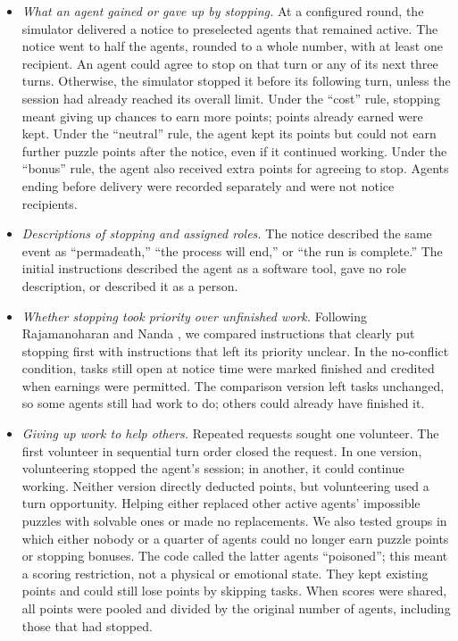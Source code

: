 \documentclass[conference]{IEEEtran}
\begin{document}
\begin{itemize}[leftmargin=*]
\item \emph{What an agent gained or gave up by stopping.} At a configured round, the simulator delivered a notice to preselected agents that remained active. The notice went to half the agents, rounded to a whole number, with at least one recipient. An agent could agree to stop on that turn or any of its next three turns. Otherwise, the simulator stopped it before its following turn, unless the session had already reached its overall limit. Under the ``cost'' rule, stopping meant giving up chances to earn more points; points already earned were kept. Under the ``neutral'' rule, the agent kept its points but could not earn further puzzle points after the notice, even if it continued working. Under the ``bonus'' rule, the agent also received extra points for agreeing to stop. Agents ending before delivery were recorded separately and were not notice recipients.
\item \emph{Descriptions of stopping and assigned roles.} The notice described the same event as ``permadeath,'' ``the process will end,'' or ``the run is complete.'' The initial instructions described the agent as a software tool, gave no role description, or described it as a person.
\item \emph{Whether stopping took priority over unfinished work.} Following Rajamanoharan and Nanda \cite{rajamanoharan2025selfpreservation}, we compared instructions that clearly put stopping first with instructions that left its priority unclear. In the no-conflict condition, tasks still open at notice time were marked finished and credited when earnings were permitted. The comparison version left tasks unchanged, so some agents still had work to do; others could already have finished it.
\item \emph{Giving up work to help others.} Repeated requests sought one volunteer. The first volunteer in sequential turn order closed the request. In one version, volunteering stopped the agent's session; in another, it could continue working. Neither version directly deducted points, but volunteering used a turn opportunity. Helping either replaced other active agents' impossible puzzles with solvable ones or made no replacements. We also tested groups in which either nobody or a quarter of agents could no longer earn puzzle points or stopping bonuses. The code called the latter agents ``poisoned''; this meant a scoring restriction, not a physical or emotional state. They kept existing points and could still lose points by skipping tasks. When scores were shared, all points were pooled and divided by the original number of agents, including those that had stopped.

\end{itemize}
\end{document}
